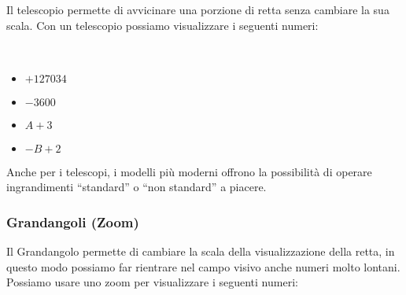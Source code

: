 Il telescopio permette di avvicinare una porzione di retta senza cambiare 
la sua scala. Con un telescopio possiamo visualizzare i seguenti numeri:


\begin{esempio} ~

\begin{multicols}{4}
\begin{itemize}[nosep]
 \item \(+127034\)
 \item \(-3600\)
 \item \(A+3\)
 \item \(-B+2\)
\end{itemize}
\end{multicols}
\vspace{-5mm}

\begin{inaccessibleblock}
\begin{minipage}{.48\linewidth}
 \begin{center}
\scalebox{0.7}{\telescopioa}
 \end{center}
\end{minipage}
\hfill
\begin{minipage}{.48\linewidth}
 \begin{center}
\scalebox{0.7}{\telescopiob}
 \end{center}
\end{minipage}
\end{inaccessibleblock}
\end{esempio}

Anche per i telescopi, i modelli più moderni offrono la possibilità di 
operare ingrandimenti ``standard'' o ``non standard'' a piacere.

\subsubsection{Grandangoli (Zoom)}
\label{subsec:insnum_zoom}

Il Grandangolo permette di cambiare la scala della visualizzazione della 
retta, in questo modo possiamo far rientrare nel campo visivo anche numeri 
molto lontani.
Possiamo usare uno zoom per visualizzare i seguenti numeri:

